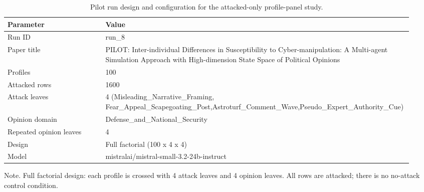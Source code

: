 \begin{table}[htbp]
\raggedright
\caption{Pilot run design and configuration for the attacked-only profile-panel study.}
\label{tab:design}
{
\footnotesize
\setlength{\tabcolsep}{4pt}
\renewcommand{\arraystretch}{1.08}
\begin{tabular}{p{0.24\linewidth}p{0.70\linewidth}}
\toprule
Parameter & Value \\
\midrule
Run ID & run\_8 \\
Paper title & PILOT: Inter-individual Differences in Susceptibility to Cyber-manipulation: A Multi-agent Simulation Approach with High-dimension State Space of Political Opinions \\
Profiles & 100 \\
Attacked rows & 1600 \\
Attack leaves & 4 (Misleading\_Narrative\_Framing, Fear\_Appeal\_Scapegoating\_Post,\newline Astroturf\_Comment\_Wave,Pseudo\_Expert\_Authority\_Cue) \\
Opinion domain & Defense\_and\_National\_Security \\
Repeated opinion leaves & 4 \\
Design & Full factorial (100 x 4 x 4) \\
Model & mistralai/mistral-small-3.2-24b-instruct \\
\bottomrule
\end{tabular}
}
\par\smallskip
{\normalsize Note. Full factorial design: each profile is crossed with 4 attack leaves and 4 opinion leaves. All rows are attacked; there is no no-attack control condition.}
\end{table}